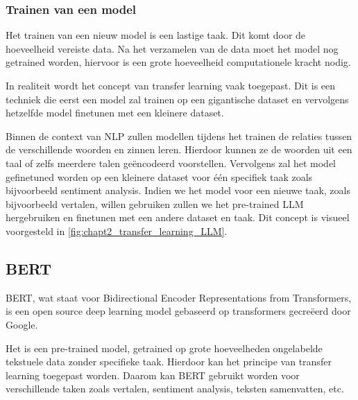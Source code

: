 
\subsubsection{Trainen van een model}
Het trainen van een nieuw model is een lastige taak. Dit komt door de hoeveelheid vereiste data. Na het verzamelen van de data moet het model nog getrained worden, hiervoor is een grote hoeveelheid computationele kracht nodig.

In realiteit wordt het concept van transfer learning vaak toegepast. Dit is een techniek die eerst een model zal trainen op een gigantische dataset en vervolgens hetzelfde model finetunen met een kleinere dataset.

Binnen de context van NLP zullen modellen tijdens het trainen de relaties tussen de verschillende woorden en zinnen leren. Hierdoor kunnen ze de woorden uit een taal of zelfs meerdere talen geëncodeerd voorstellen. Vervolgens zal het model gefinetuned worden op een kleinere dataset voor één specifiek taak zoals bijvoorbeeld sentiment analysis. Indien we het model voor een nieuwe taak, zoals bijvoorbeeld vertalen, willen gebruiken zullen we het pre-trained LLM hergebruiken en finetunen met een andere dataset en taak. Dit concept is visueel voorgesteld in \autoref{fig:chapt2_transfer_learning_LLM}.


\subsection{BERT}
BERT, wat staat voor Bidirectional Encoder Representations from Transformers, is een open source deep learning model gebaseerd op transformers gecreëerd door Google.

Het is een pre-trained model, getrained op grote hoeveelheden ongelabelde tekstuele data zonder specifieke taak. Hierdoor kan het principe van transfer learning toegepast worden. Daarom kan BERT gebruikt worden voor verschillende taken zoals vertalen, sentiment analysis, teksten samenvatten, etc.


